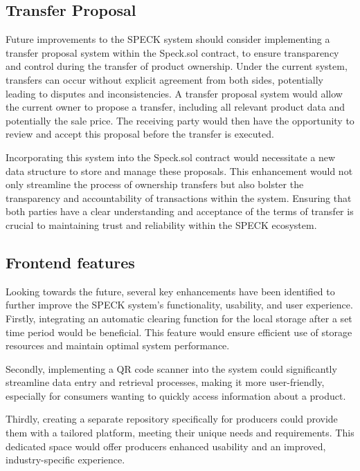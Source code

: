 \documentclass[oneside,a4paper,12pt, colorinlistoftodos]{article} %
\begin{document}
\subsection{Transfer Proposal}
Future improvements to the SPECK system should consider implementing a transfer proposal system within the Speck.sol contract, to ensure transparency and control during the transfer of product ownership. Under the current system, transfers can occur without explicit agreement from both sides, potentially leading to disputes and inconsistencies. A transfer proposal system would allow the current owner to propose a transfer, including all relevant product data and potentially the sale price. The receiving party would then have the opportunity to review and accept this proposal before the transfer is executed.

Incorporating this system into the Speck.sol contract would necessitate a new data structure to store and manage these proposals. This enhancement would not only streamline the process of ownership transfers but also bolster the transparency and accountability of transactions within the system. Ensuring that both parties have a clear understanding and acceptance of the terms of transfer is crucial to maintaining trust and reliability within the SPECK ecosystem.


\subsection{Frontend features}\label{se:future_work_frontend}

Looking towards the future, several key enhancements have been identified to further improve the SPECK system's functionality, usability, and user experience. 
Firstly, integrating an automatic clearing function for the local storage after a set time period would be beneficial. This feature would ensure efficient use of storage resources and maintain optimal system performance.

Secondly, implementing a QR code scanner into the system could significantly streamline data entry and retrieval processes, making it more user-friendly, especially for consumers wanting to quickly access information about a product.

Thirdly, creating a separate repository specifically for producers could provide them with a tailored platform, meeting their unique needs and requirements. This dedicated space would offer producers enhanced usability and an improved, industry-specific experience.
\end{document}
